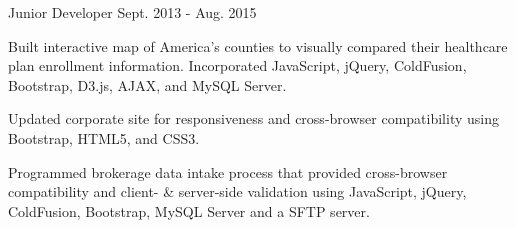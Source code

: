 \begin{cventries}
  \cventry
    {Junior Developer} %
    {} %
    {} %
    {Sept. 2013 - Aug. 2015} %
    {
      \begin{cvitems} %
        \item {Built interactive map of America's counties to visually compared their healthcare plan enrollment information. Incorporated JavaScript, jQuery, ColdFusion, Bootstrap, D3.js, AJAX, and MySQL Server.}
        \item {Updated corporate site for responsiveness and cross-browser compatibility using Bootstrap, HTML5, and CSS3.}
        \item {Programmed brokerage data intake process that provided cross-browser compatibility and client- \& server-side validation using JavaScript, jQuery, ColdFusion, Bootstrap, MySQL Server and a SFTP server.}
      \end{cvitems}
    }


\end{cventries}
